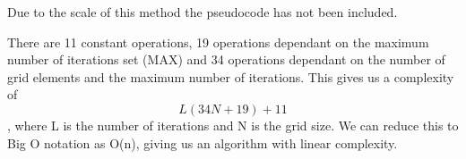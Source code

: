 \documentclass[aps,twocolumn,pre,nofootinbib,10pt]{revtex4-1}
\newcommand*\Let[2]{\State #1 $\gets$ #2}
\begin{document}

Due to the scale of this method the pseudocode has not been included. 

There are 11 constant operations, 19 operations dependant on the maximum number of iterations set (MAX) and 34 operations dependant on the number of grid elements and the maximum number of iterations. This gives us a complexity of \[L(34N+19)+11\], where L is the number of iterations and N is the grid size. We can reduce this to Big O notation as O(n), giving us an algorithm with linear complexity.
\end{document}

